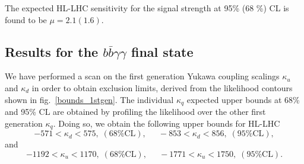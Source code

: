 The expected HL-LHC sensitivity for the signal strength  at 95\% (68 \%) CL is found to be $\mu  = 2.1 (1.6)$.
\par
\subsection{Results for the $b\bar{b}\gamma\gamma$ final state}
We have performed a scan on the first generation Yukawa coupling scalings $ \kappa_u$ and $ \kappa_d$ in order to obtain exclusion limits, derived from the likelihood contours shown in fig.~\ref{bounds_1stgen}. The individual $\kappa_q$ expected upper bounds at 68\% and 95\% CL are obtained by profiling the likelihood over the other first generation $\kappa_q$.  Doing so, we obtain the following upper bounds for HL-LHC
\begin{equation}
	-571  < \kappa_d <  575, \;(\text{68\% CL}), \, \;\;\;\; \,
	-853 < \kappa_d <  856,\;(\text{95\% CL}),
\end{equation}
and %
\begin{equation}
	-1192  < \kappa_u < 1170, \;(\text{68\% CL}), \, \;\;\;\; \,
	-1771 < \kappa_u <  1750,\;(\text{95\% CL}).
\end{equation}

